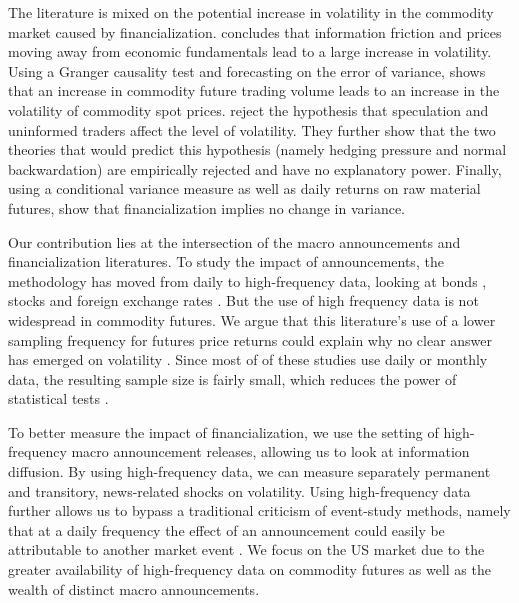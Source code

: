 \documentclass[12pt]{article}
\begin{document}
%

The literature is mixed on the potential increase in volatility in the commodity market caused by financialization. \citet{singleton2014investor} concludes that information friction and prices moving away from economic fundamentals lead to a large increase in volatility. Using a Granger causality test and forecasting on the error of variance, \citet{yang2005futures} shows that an increase in commodity future trading volume leads to an increase in the volatility of commodity spot prices. \citet{bryant2006causality} reject the hypothesis that speculation and uninformed traders affect the level of volatility. They further show that the two theories that would predict this hypothesis (namely hedging pressure and normal backwardation) are empirically rejected and have no explanatory power. Finally, using a conditional variance measure as well as daily returns on raw material futures, \citet{bohl2013does} show that financialization implies no change in variance.


Our contribution lies at the intersection of the macro announcements and financialization literatures. To study the impact of announcements, the methodology has moved from daily to high-frequency data, looking at  bonds  \citep{andersen2007real, hu2013noise, balduzzi2001economic,lee1995oil, hautsch2011impact, kurov2019price}, stocks \citep{andersen2007real,bernile2016can,kurov2019price} and foreign exchange rates \citep{lee1995oil,andersen2003micro}. But the use of high frequency data is not widespread in commodity futures. We argue that this literature's use of a lower sampling frequency for futures price returns could explain why no clear answer has emerged on volatility \citep{tang2012index,brunetti2016speculators,irwin2012testing,stoll2010commodity,alquist2013role}. Since most of of these studies use daily or monthly data, the resulting sample size is fairly small, which reduces the power of statistical tests \citep{irwin2009devil}.  

To better measure the impact of financialization, we use the setting of high-frequency macro announcement releases, allowing us to look at information diffusion. By using high-frequency data, we can measure separately permanent and transitory, news-related shocks on volatility.
Using high-frequency data further allows us to bypass a traditional criticism of event-study methods, namely that at a daily frequency the effect of an announcement could easily be attributable to another market event \citep{kothari2007econometrics}. We focus on the US market due to the greater availability of high-frequency data on commodity futures as well as the wealth of distinct macro announcements.
\end{document}
